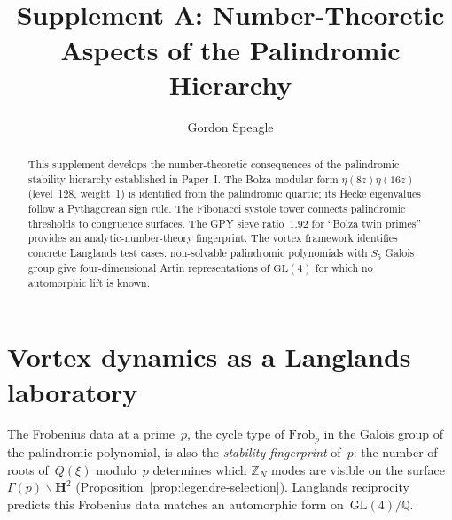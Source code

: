 



\title{\seriestitle\\[6pt]\large Supplement A: Number-Theoretic Aspects of the Palindromic Hierarchy}
\author{Gordon Speagle}
\date{}


\maketitle

\begin{abstract}
This supplement develops the number-theoretic consequences of the palindromic
stability hierarchy established in Paper~I.
The Bolza modular form $\eta(8z)\eta(16z)$ (level~128, weight~1)
is identified from the palindromic quartic; its Hecke eigenvalues
follow a Pythagorean sign rule.
The Fibonacci systole tower connects palindromic thresholds to
congruence surfaces.
The GPY sieve ratio~$1.92$ for ``Bolza twin primes'' provides
an analytic-number-theory fingerprint.
The vortex framework identifies concrete Langlands test cases:
non-solvable palindromic polynomials with $S_5$ Galois group
give four-dimensional Artin representations of $\mathrm{GL}(4)$
for which no automorphic lift is known.
\end{abstract}



\section{Vortex dynamics as a Langlands laboratory}
\label{sec:langlands-lab}

The Frobenius data at a prime~$p$, the cycle type of
$\mathrm{Frob}_p$ in the Galois group of the palindromic
polynomial, is also the \emph{stability fingerprint} of~$p$:
the number of roots of~$Q(\xi)$ modulo~$p$ determines
which $\mathbb{Z}_N$ modes are visible on the surface
$\Gamma(p)\backslash\mathbf{H}^2$
(Proposition~\ref{prop:legendre-selection}).
Langlands reciprocity predicts this Frobenius data
matches an automorphic form on~$\mathrm{GL}(4)/\mathbb{Q}$.

